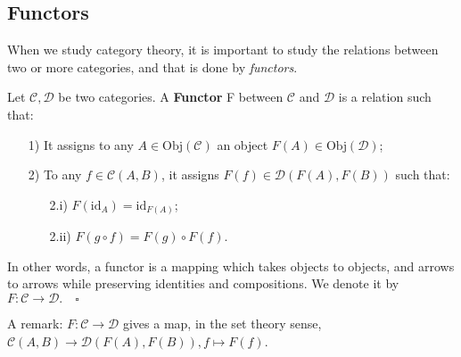 \documentclass[../category_theory.tex]{subfiles}
\begin{document}
\subsection{Functors}
When we study category theory, it is important to study the relations between two or more categories, and that is done by \textit{functors}.
\begin{def*}
	Let \(\mathcal{C}, \mathcal{D}\) be two categories. A \textbf{Functor} F between \(\mathcal{C}\) and \(\mathcal{D}\) is a relation such that:
	\begin{itemize}
		\item[1)] It assigns to any \(A\in \mathrm{Obj}(\mathcal{C})\) an object \(F(A)\in \mathrm{Obj}(\mathcal{D})\);
		\item[2)] To any \(f\in \mathcal{C}(A, B)\), it assigns \(F(f)\in \mathcal{D}(F(A), F(B))\) such that:
		      \begin{itemize}
			      \item[2.i)] \(F(\mathrm{id}_{A})=\mathrm{id}_{F(A)}\);
			      \item[2.ii)] \(F(g\circ f)=F(g)\circ F(f)\).
		      \end{itemize}
	\end{itemize}
	In other words, a functor is a mapping which takes objects to objects, and arrows to arrows while preserving identities and compositions. We denote it by \(F:\mathcal{C}\rightarrow \mathcal{D}.\quad \square\)
\end{def*}
A remark: \(F:\mathcal{C}\rightarrow \mathcal{D}\) gives a map, in the set theory sense, \(\mathcal{C}(A, B)\longrightarrow \mathcal{D}(F(A), F(B)), f \mapsto F(f)\).
\end{document}
